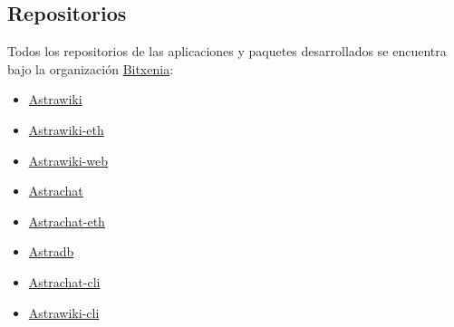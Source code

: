\subsection{Repositorios}

Todos los repositorios de las aplicaciones y paquetes desarrollados se encuentra bajo la organización \href{https://github.com/bitxenia}{Bitxenia}:

\begin{itemize}
    \item \href{https://github.com/bitxenia/astrawiki}{Astrawiki}
    \item \href{https://github.com/bitxenia/astrawiki-eth}{Astrawiki-eth}
    \item \href{https://github.com/bitxenia/astrawiki-web}{Astrawiki-web}
    \item \href{https://github.com/bitxenia/astrachat}{Astrachat}
    \item \href{https://github.com/bitxenia/astrachat-eth}{Astrachat-eth}
    \item \href{https://github.com/bitxenia/astradb}{Astradb}
    \item \href{https://github.com/bitxenia/astrachat-cli}{Astrachat-cli}
    \item \href{https://github.com/bitxenia/astrawiki-cli}{Astrawiki-cli}
\end{itemize}
